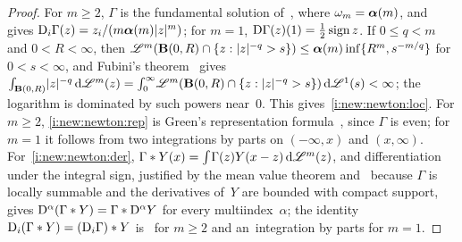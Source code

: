 \documentclass[a4paper,twoside,leqno]{article}
\begin{document}
\begin{proof}
    For $m \ge 2$, $\Gamma$ is the fundamental solution of~\cite[(2.12)]{Gilbarg2001a},
    where $\omega_m = \boldsymbol{\alpha}(m)$, and~\cite[(2.13)]{Gilbarg2001a} gives $\mathrm{D}_i \Gamma(z) = z_i
    / (m \boldsymbol{\alpha}(m) |z|^m)$; for $m = 1$, $\mathrm{D} \Gamma(z)(1) = \frac 12 \operatorname{sign}
    z$. If $0 \le q < m$ and $0 < R < \infty$, then $\mathscr{L}^m(\mathbf{B}(0,R) \cap \{ z : |z|^{-q} > s
    \}) \le \boldsymbol{\alpha}(m) \inf \{ R^m, s^{-m/q} \}$ for $0 < s < \infty$, and Fubini's
    theorem~\cite[2.6.2]{Federer1969} gives ${\textstyle\int_{\mathbf{B}(0,R)}^{}} |z|^{-q} \,\mathrm{d} \mathscr{L}^m(z) =
    {\textstyle\int_{0}^{\infty}} \mathscr{L}^m(\mathbf{B}(0,R) \cap \{ z : |z|^{-q} > s \}) \,\mathrm{d} \mathscr{L}^1(s) < \infty$; the
    logarithm is dominated by such powers near~$0$. This gives~\ref{i:new:newton:loc}. For $m \ge 2$,
    \ref{i:new:newton:rep} is Green's representation formula~\cite[(2.17)]{Gilbarg2001a}, since
    $\Gamma$ is even; for $m = 1$ it follows from two integrations by parts on $(-\infty,x)$ and
    $(x,\infty)$. For~\ref{i:new:newton:der}, $\Gamma * Y(x) = {\textstyle\int_{}^{}} \Gamma(z) Y(x - z) \,\mathrm{d}
    \mathscr{L}^m(z)$, and differentiation under the integral sign, justified by the mean value theorem
    and~\cite[2.4.9]{Federer1969} because $\Gamma$ is locally summable and the derivatives of~$Y$
    are bounded with compact support, gives $\mathrm{D}^\alpha (\Gamma * Y) = \Gamma * \mathrm{D}^\alpha Y$ for
    every multiindex~$\alpha$; the identity $\mathrm{D}_i(\Gamma * Y) = (\mathrm{D}_i \Gamma) * Y$
    is~\cite[Lemma~4.1]{Gilbarg2001a} for $m \ge 2$ and an~integration by parts for $m = 1$.


\end{proof}
\end{document}
